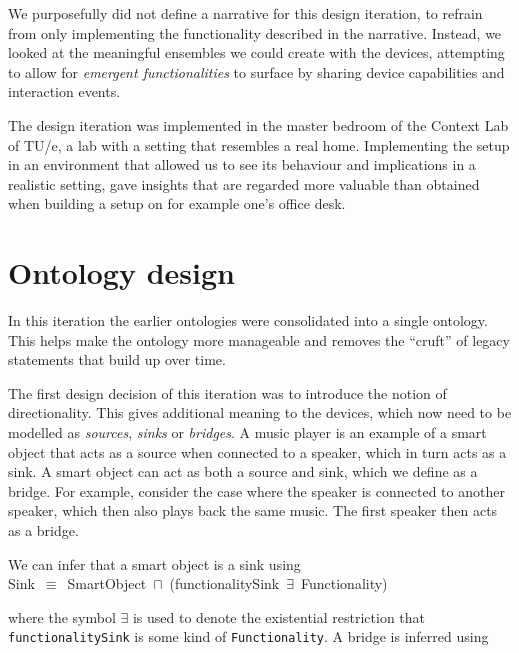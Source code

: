 We purposefully did not define a narrative for this design iteration, to refrain from only implementing the functionality described in the narrative. Instead, we looked at the meaningful ensembles we could create with the devices, attempting to allow for \emph{emergent functionalities} to surface by sharing device capabilities and interaction events.

The design iteration was implemented in the master bedroom of the Context Lab of TU/e, a lab with a setting that resembles a real home. Implementing the setup in an environment that allowed us to see its behaviour and implications in a realistic setting, gave insights that are regarded more valuable than obtained when building a setup on for example one's office desk. 


\section{Ontology design}
\label{OntologyDesign3}

In this iteration the earlier ontologies were consolidated into a single ontology. This helps make the ontology more manageable and removes the ``cruft'' of legacy statements that build up over time. 

The first design decision of this iteration was to introduce the notion of directionality. This gives additional meaning to the devices, which now need to be modelled as \emph{sources}, \emph{sinks} or \emph{bridges}. A music player is an example of a smart object that acts as a source when connected to a speaker, which in turn acts as a sink. A smart object can act as both a source and sink, which we define as a bridge. For example, consider the case where the speaker is connected to another speaker, which then also plays back the same music. The first speaker then acts as a bridge.

We can infer that a smart object is a sink using\\

\noindent Sink~\ensuremath{\equiv}~SmartObject~\ensuremath{\sqcap}~(functionalitySink~\ensuremath{\exists}~Functionality)\\ 

where the symbol \ensuremath{\exists} is used to denote the existential restriction that \texttt{functionalitySink} is some kind of \texttt{Functionality}. A bridge is inferred using\\

